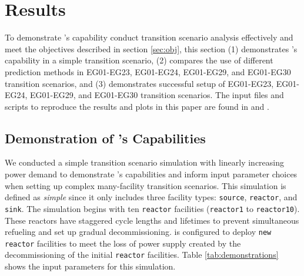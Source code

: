 \section{Results}
To demonstrate \deploy's capability conduct transition
scenario analysis effectively and meet the objectives described in section 
\ref{sec:obj}, this section 
(1) demonstrates \deploy's capability in a simple transition scenario, 
(2) compares the use of different \deploy prediction methods in EG01-EG23, EG01-EG24, 
EG01-EG29, and EG01-EG30 transition scenarios, and
(3) demonstrates successful \deploy setup of EG01-EG23, EG01-EG24, 
EG01-EG29, and EG01-EG30 transition scenarios. 
The input files and scripts to reproduce the results and plots in this
paper are found in \cite{noauthor_arfc/d3ploy:_2019} and 
\cite{chee_arfc/transition-scenarios_2019}. 

\subsection{Demonstration of \deploy's Capabilities}
\label{sec:demo}
We conducted a simple transition scenario simulation with
linearly increasing power demand
to demonstrate \deploy's capabilities and inform input parameter 
choices when setting up complex many-facility transition scenarios. 
This simulation is defined as \textit{simple} since 
it only includes
three facility types: \texttt{source}, \texttt{reactor}, and 
\texttt{sink}. 
The simulation begins with ten \texttt{reactor} facilities 
(\texttt{reactor1} to \texttt{reactor10}). 
These reactors have staggered cycle lengths and lifetimes to prevent 
simultaneous refueling and set up gradual decommissioning. 
\deploy is configured to deploy \texttt{new reactor} facilities
to meet the loss of power supply created by the decommissioning 
of the initial \texttt{reactor} facilities. 
Table \ref{tab:demonstrations} shows the \deploy input parameters 
for this simulation.  


